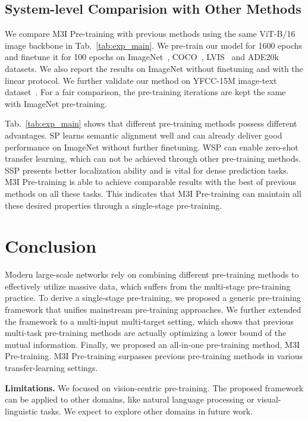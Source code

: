 \documentclass[10pt,twocolumn,letterpaper]{article}
\def\name{M3I Pre-training}
\begin{document}
\subsection{System-level Comparision with Other Methods}
\label{sec:exp_main}

We compare \name{} with previous methods using the same ViT-B/16~\cite{dosovitskiy2020image} image backbone in Tab.~\ref{tab:exp_main}. We pre-train our model for 1600 epochs and finetune it for 100 epochs on ImageNet~\cite{deng2009imagenet}, COCO~\cite{lin2014microsoft}, LVIS~\cite{gupta2019lvis} and ADE20k~\cite{zhou2017scene} datasets. We also report the results on ImageNet without finetuning and with the linear protocol. We further validate our method on YFCC-15M image-text dataset~\cite{kalkowski2015real}. For a fair comparison, the pre-training iterations are kept the same with ImageNet pre-training.

Tab.~\ref{tab:exp_main} shows that different pre-training methods possess different advantages. SP learns semantic alignment well and can already deliver good performance on ImageNet without further finetuning. WSP can enable zero-shot transfer learning, which can not be achieved through other pre-training methods. SSP presents better localization ability and is vital for dense prediction tasks. \name{} is able to achieve comparable results with the best of previous methods on all these tasks. This indicates that \name{} can maintain all these desired properties through a single-stage pre-training. 

 \section{Conclusion}
\label{sec:conclusion}
Modern large-scale networks rely on combining different pre-training methods to effectively utilize massive data, which suffers from the multi-stage pre-training practice. To derive a single-stage pre-training, we proposed a generic pre-training framework that unifies mainstream pre-training approaches. We further extended the framework to a multi-input multi-target setting, which shows that previous multi-task pre-training methods are actually optimizing a lower bound of the mutual information. Finally, we proposed an all-in-one pre-training method, \name{}. \name{} surpasses previous pre-training methods in various transfer-learning settings. 

\noindent\textbf{Limitations.} We focused on vision-centric pre-training. The proposed framework can be applied to other domains, like natural language processing or visual-linguistic tasks. We expect to explore other domains in future work.
 \vspace{-1.0em}
\end{document}

